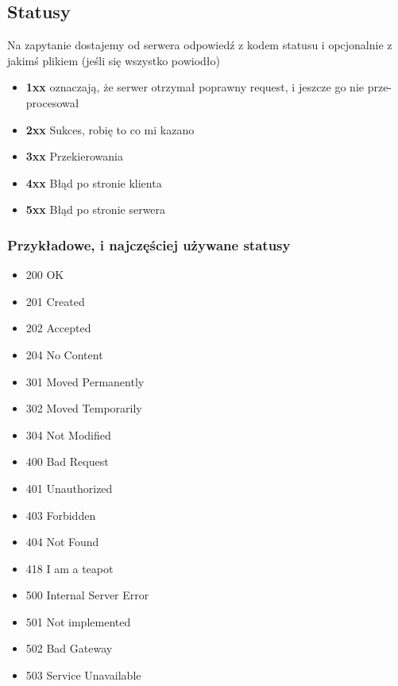 \subsection{Statusy}
Na zapytanie dostajemy od serwera odpowiedź z kodem statusu i opcjonalnie z jakimś plikiem (jeśli się wszystko powiodło)\\
\begin{itemize}
  \item \textbf{1xx} oznaczają, że serwer otrzymał poprawny request, i jeszcze go nie prze-procesował 
  \item \textbf{2xx} Sukces, robię to co mi kazano
  \item \textbf{3xx} Przekierowania
  \item \textbf{4xx} Błąd po stronie klienta
  \item \textbf{5xx} Błąd po stronie serwera
\end{itemize}

\subsubsection{Przykładowe, i najczęściej używane statusy}
\begin{multicols}{2}
\begin{itemize}
    \item 200 OK
    \item 201 Created
    \item 202 Accepted
    \item 204 No Content
    \item 301 Moved Permanently
    \item 302 Moved Temporarily
    \item 304 Not Modified
    \item 400 Bad Request
    \item 401 Unauthorized
    \item 403 Forbidden
    \item 404 Not Found
    \item 418 I am a teapot
    \item 500 Internal Server Error
    \item 501 Not implemented
    \item 502 Bad Gateway
    \item 503 Service Unavailable
\end{itemize}
\end{multicols}

